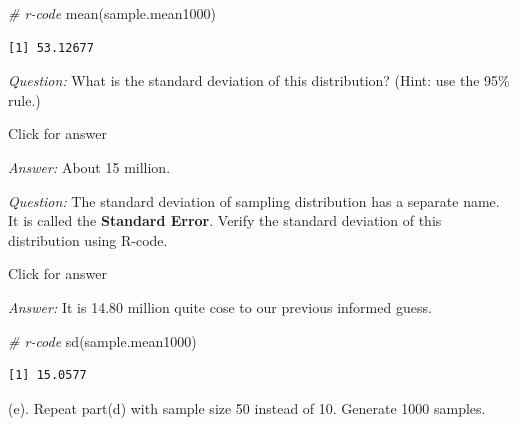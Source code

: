 \documentclass[
]{book}
\newenvironment{Shaded}{\begin{snugshade}}{\end{snugshade}}
\newcommand{\CommentTok}[1]{\textcolor[rgb]{0.56,0.35,0.01}{\textit{#1}}}
\newcommand{\FunctionTok}[1]{\textcolor[rgb]{0.00,0.00,0.00}{#1}}
\newcommand{\NormalTok}[1]{#1}
\begin{document}
\begin{Shaded}
\begin{Highlighting}[]
\CommentTok{\# r{-}code}
\FunctionTok{mean}\NormalTok{(sample.mean1000)}
\end{Highlighting}
\end{Shaded}

\begin{verbatim}
[1] 53.12677
\end{verbatim}

\emph{Question:} What is the standard deviation of this distribution? (Hint: use the 95\% rule.)

Click for answer

\emph{Answer:} About 15 million.

\emph{Question:} The standard deviation of sampling distribution has a separate name. It is called the \textbf{Standard Error}. Verify the standard deviation of this distribution using R-code.

Click for answer

\emph{Answer:} It is 14.80 million quite cose to our previous informed guess.

\begin{Shaded}
\begin{Highlighting}[]
\CommentTok{\# r{-}code}
\FunctionTok{sd}\NormalTok{(sample.mean1000)}
\end{Highlighting}
\end{Shaded}

\begin{verbatim}
[1] 15.0577
\end{verbatim}

(e). Repeat part(d) with sample size 50 instead of 10. Generate 1000 samples.
\end{document}
